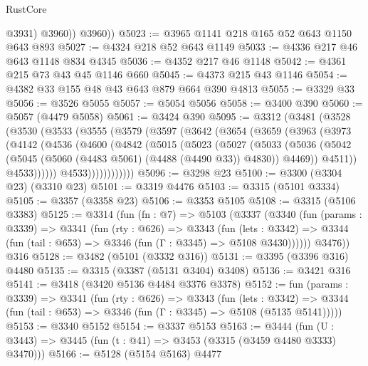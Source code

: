 \begin{lexlean}{RustCore}
\begin{coremodule}
              @3931)
            @3960))
        @3960))
@5023 := @3965 @1141 @218 @165 @52 @643 @1150 @643 @893
@5027 := @4324 @218 @52 @643 @1149
@5033 := @4336 @217 @46 @643 @1148 @834 @4345
@5036 := @4352 @217 @46 @1148
@5042 := @4361 @215 @73 @43 @45 @1146 @660
@5045 := @4373 @215 @43 @1146
@5054 := @4382 @33 @155 @48 @43 @643 @879 @664 @390 @4813
@5055 := @3329 @33
@5056 := @3526 @5055
@5057 := @5054 @5056
@5058 := @3400 @390
@5060 := @5057 (@4479 @5058)
@5061 := @3424 @390
@5095 := @3312
    (@3481
      (@3528
        (@3530
          (@3533
            (@3555
              (@3579
                (@3597
                  (@3642
                    (@3654
                      (@3659
                        (@3963
                          (@3973
                            (@4142
                              (@4536
                                (@4600
                                  (@4842
                                    (@5015
                                      (@5023
                                        (@5027
                                          (@5033
                                            (@5036
                                              (@5042
                                                (@5045
                                                  (@5060 (@4483 @5061) (@4488 (@4490 @33)) @4830))
                                                @4469))
                                            @4511))
                                        @4533))))))
                            @4533))))))))))))
@5096 := @3298 @23
@5100 := @3300 (@3304 @23) (@3310 @23)
@5101 := @3319 @4476
@5103 := @3315 (@5101 @3334)
@5105 := @3357 (@3358 @23)
@5106 := @3353 @5105
@5108 := @3315 (@5106 @3383)
@5125 := @3314
    (fun (fn : @7) =>
    @5103
      (@3337
        (@3340
          (fun (params : @3339) =>
          @3341
            (fun (rty : @626) =>
            @3343
              (fun (lets : @3342) =>
              @3344 (fun (tail : @653) => @3346 (fun (Γ : @3345) => @5108 @3430))))))
        @3476))
    @316
@5128 := @3482 (@5101 (@3332 @316))
@5131 := @3395 (@3396 @316) @4480
@5135 := @3315 (@3387 (@5131 @3404) @3408)
@5136 := @3421 @316
@5141 := @3418 (@3420 @5136 @4484 @3376 @3378)
@5152 := fun (params : @3339) =>
  @3341
    (fun (rty : @626) =>
    @3343
      (fun (lets : @3342) =>
      @3344 (fun (tail : @653) => @3346 (fun (Γ : @3345) => @5108 (@5135 @5141)))))
@5153 := @3340 @5152
@5154 := @3337 @5153
@5163 := @3444 (fun (U : @3443) => @3445 (fun (t : @41) => @3453 (@3315 (@3459 @4480 @3333) @3470)))
@5166 := @5128 (@5154 @5163) @4477

\end{coremodule}
\end{lexlean}
